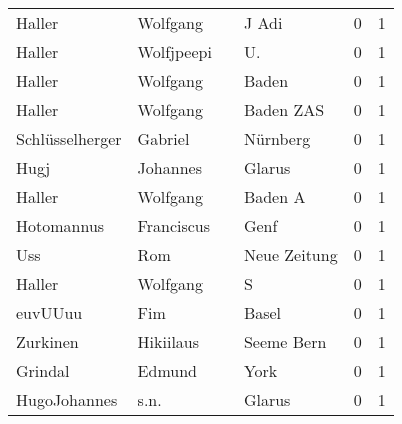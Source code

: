 \begin{tabular}{llllrr}
                   Haller &                           Wolfgang &             &                                       J Adi &          0 &         1 \\
                   Haller &                         Wolfjpeepi &             &                                         U.  &          0 &         1 \\
                   Haller &                           Wolfgang &             &                                       Baden &          0 &         1 \\
                   Haller &                           Wolfgang &             &                                   Baden ZAS &          0 &         1 \\
          Schlüsselherger &                            Gabriel &             &                                    Nürnberg &          0 &         1 \\
                     Hugj &                           Johannes &             &                                      Glarus &          0 &         1 \\
                   Haller &                           Wolfgang &             &                                     Baden A &          0 &         1 \\
               Hotomannus &                         Franciscus &             &                                        Genf &          0 &         1 \\
                      Uss &                                Rom &             &                                Neue Zeitung &          0 &         1 \\
                   Haller &                           Wolfgang &             &                                           S &          0 &         1 \\
                  euvUUuu &                                Fim &             &                                       Basel &          0 &         1 \\
                 Zurkinen &                          Hikiilaus &             &                                  Seeme Bern &          0 &         1 \\
                  Grindal &                             Edmund &             &                                        York &          0 &         1 \\
             HugoJohannes &                               s.n. &             &                                      Glarus &          0 &         1 \\

\end{tabular}
